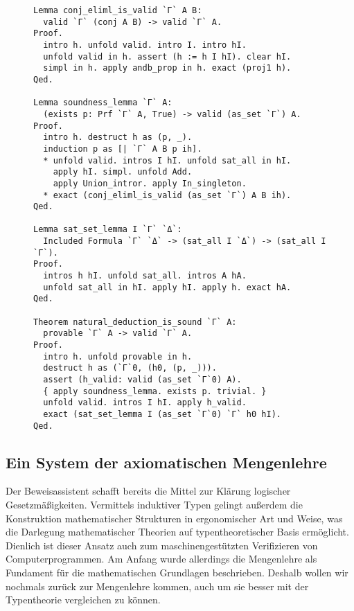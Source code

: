 \begin{figure}
\begin{lstlisting}[language=Coq, xleftmargin=\mathindent, escapechar=`,
label=lst:Korrektheit-KdnS, caption={Korrektheit des natürliches Schließens}]
Lemma conj_eliml_is_valid `Γ` A B:
  valid `Γ` (conj A B) -> valid `Γ` A.
Proof.
  intro h. unfold valid. intro I. intro hI.
  unfold valid in h. assert (h := h I hI). clear hI.
  simpl in h. apply andb_prop in h. exact (proj1 h).
Qed.

Lemma soundness_lemma `Γ` A:
  (exists p: Prf `Γ` A, True) -> valid (as_set `Γ`) A.
Proof.
  intro h. destruct h as (p, _).
  induction p as [| `Γ` A B p ih].
  * unfold valid. intros I hI. unfold sat_all in hI.
    apply hI. simpl. unfold Add.
    apply Union_intror. apply In_singleton.
  * exact (conj_eliml_is_valid (as_set `Γ`) A B ih).
Qed.

Lemma sat_set_lemma I `Γ` `Δ`:
  Included Formula `Γ` `Δ` -> (sat_all I `Δ`) -> (sat_all I `Γ`).
Proof.
  intros h hI. unfold sat_all. intros A hA.
  unfold sat_all in hI. apply hI. apply h. exact hA.
Qed.

Theorem natural_deduction_is_sound `Γ` A:
  provable `Γ` A -> valid `Γ` A.
Proof.
  intro h. unfold provable in h.
  destruct h as (`Γ`0, (h0, (p, _))).
  assert (h_valid: valid (as_set `Γ`0) A).
  { apply soundness_lemma. exists p. trivial. }
  unfold valid. intros I hI. apply h_valid.
  exact (sat_set_lemma I (as_set `Γ`0) `Γ` h0 hI).
Qed.
\end{lstlisting}
\end{figure}

\subsection{Ein System der axiomatischen Mengenlehre}

Der Beweisassistent schafft bereits die Mittel zur Klärung logischer
Gesetzmäßigkeiten. Vermittels induktiver Typen gelingt außerdem die
Konstruktion mathematischer Strukturen in ergonomischer Art und Weise,
was die Darlegung mathematischer Theorien auf typentheoretischer Basis
ermöglicht. Dienlich ist dieser Ansatz auch zum maschinengestützten
Verifizieren von Computerprogrammen. Am Anfang wurde allerdings die
Mengenlehre als Fundament für die mathematischen Grundlagen beschrieben.
Deshalb wollen wir nochmals zurück zur Mengenlehre kommen, auch um sie
besser mit der Typentheorie vergleichen zu können.

